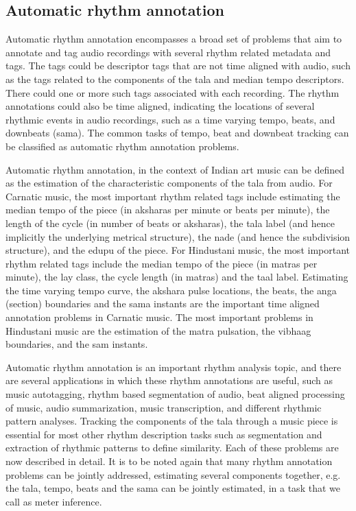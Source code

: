\subsection{Automatic rhythm annotation}\label{sec:probdef:autoannot}
Automatic rhythm annotation encompasses a broad set of problems that aim to annotate and tag audio recordings with several rhythm related metadata and tags. The tags could be descriptor tags that are not time aligned with audio, such as the tags related to the components of the \gls{tala} and median tempo descriptors. There could one or more such tags associated with each recording. The rhythm annotations could also be time aligned, indicating the locations of several rhythmic events in audio recordings, such as a time varying tempo, beats, and downbeats (\gls{sama}). The common tasks of tempo, beat and downbeat tracking can be classified as automatic rhythm annotation problems. 

Automatic rhythm annotation, in the context of Indian art music can be defined as the estimation of the characteristic components of the \gls{tala} from audio. For Carnatic music, the most important rhythm related tags include estimating the median tempo of the piece (in \glspl{akshara} per minute or beats per minute), the length of the cycle (in number of beats or \glspl{akshara}), the \gls{tala} label (and hence implicitly the underlying metrical structure), the \gls{nade} (and hence the subdivision structure), and the \gls{edupu} of the piece. For Hindustani music, the most important rhythm related tags include the median tempo of the piece (in \glspl{matra} per minute), the \gls{lay} class, the cycle length (in \glspl{matra}) and the \gls{taal} label. Estimating the time varying tempo curve, the \gls{akshara} pulse locations, the beats, the \gls{anga} (section) boundaries and the \gls{sama} instants are the important time aligned annotation problems in Carnatic music. The most important problems in Hindustani music are the estimation of the \gls{matra} pulsation, the \gls{vibhaag} boundaries, and the \gls{sam} instants. 

Automatic rhythm annotation is an important rhythm analysis topic, and there are several applications in which these rhythm annotations are useful, such as music autotagging, rhythm based segmentation of audio, beat aligned processing of music, audio summarization, music transcription, and different rhythmic pattern analyses. Tracking the components of the \gls{tala} through a music piece is essential for most other rhythm description tasks such as segmentation and extraction of rhythmic patterns to define similarity. Each of these problems are now described in detail. It is to be noted again that many rhythm annotation problems can be jointly addressed, estimating several components together, e.g. the \gls{tala}, tempo, beats and the \gls{sama} can be jointly estimated, in a task that we call as meter inference. 
% 
